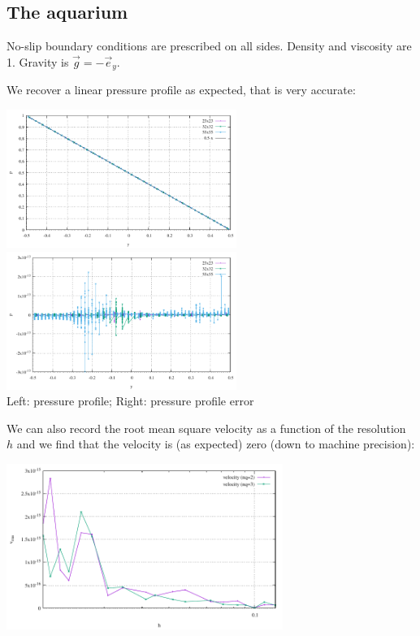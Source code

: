 \subsection*{The aquarium}

No-slip boundary conditions are prescribed on all sides. Density and viscosity are 1.
Gravity is $\vec{g}=-\vec{e}_y$. 

We recover a linear pressure profile as expected, that is very accurate:

\begin{center}
\includegraphics[width=7.5cm]{python_codes/fieldstone_80/results/aquarium/p}
\includegraphics[width=7.5cm]{python_codes/fieldstone_80/results/aquarium/p_error}\\
{\captionfont Left: pressure profile; Right: pressure profile error}
\end{center}

We can also record the root mean square velocity as a function of the resolution $h$
and we find that the velocity is (as expected) zero (down to machine precision):
\begin{center}
\includegraphics[width=9cm]{python_codes/fieldstone_80/results/aquarium/vrms}
\end{center}


